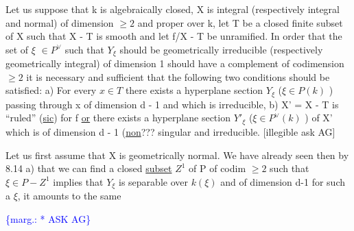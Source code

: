 \documentclass[11pt]{article}
\newcommand{\scanpage}[1]{\par\bigskip\noindent{\small\sffamily[scan #1]}\par}
\newcommand{\mspage}[1]{{\small\sffamily[p.\,#1]}}
\newcommand{\margin}[1]{\textcolor{blue}{\{\textsf{marg.:} #1\}}}
\newcommand{\uline}[1]{\underline{#1}}
\begin{document}
Let us suppose that k is algebraically closed, X is integral
(respectively integral and normal) of dimension $\geq 2$ and proper
over k, let T be a closed finite subset of X such that X - T is
smooth and let f/X - T be unramified.  In order that the set of $\xi$
$\in P^{\vee}$ such that $Y_{\xi}$ should be geometrically irreducible (respectively
geometrically integral) of dimension 1 should have a complement of
codimension $\geq 2$ it is necessary and sufficient that the following
two conditions should be satisfied:  a) For every $x \in T$ there
exists a hyperplane section $Y_{\xi}$ ($\xi \in P(k)$ ) passing through x of
dimension d - 1 and which is irreducible, b) X' = X - T is ``ruled''
(\uline{sic}) for f \uline{or} there exists a hyperplane section $Y'_{\xi}$ ($\xi \in P^{\vee}(k)$ ) of
X' which is of dimension d - 1 (\uline{non}??? singular and irreducible.
[illegible ask AG]

Let us first assume that X is geometrically normal.  We have
already seen then by 8.14  a) that we can find a closed \uline{subset} $Z^{1}$
of P of codim $\geq 2$ such that $\xi \in P-Z^{1}$ implies that $Y_{\xi}$ is separable
over $k(\xi)$ and of dimension d-1 for such a $\xi$, it amounts to the same

\margin{* ASK AG}

\clearpage
\scanpage{24/59}
\mspage{59}
\end{document}
